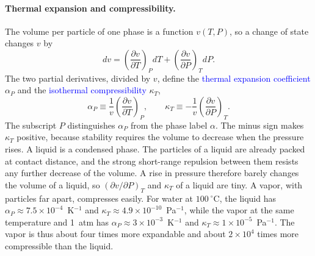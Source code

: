 \paragraph{Thermal expansion and compressibility.}
The volume per particle of one phase is a function $v(T,P)$, so a change of
state changes $v$ by
\begin{equation}
    dv=\left(\frac{\partial v}{\partial T}\right)_{\!P}dT
      +\left(\frac{\partial v}{\partial P}\right)_{\!T}dP.
\end{equation}
The two partial derivatives, divided by $v$, define the
\textcolor{blue}{thermal expansion coefficient} $\alpha_P$ and the
\textcolor{blue}{isothermal compressibility} $\kappa_T$,
\begin{equation}
    \boxed{\alpha_P\equiv\frac{1}{v}\left(\frac{\partial v}{\partial T}\right)_{\!P},
    \qquad
    \kappa_T\equiv-\frac{1}{v}\left(\frac{\partial v}{\partial P}\right)_{\!T}.}
\end{equation}
The subscript $P$ distinguishes $\alpha_P$ from the phase label $\alpha$.
The minus sign makes $\kappa_T$ positive, because stability requires the
volume to decrease when the pressure rises. A liquid is a condensed phase.
The particles of a liquid are already packed at contact distance, and the
strong short-range repulsion between them resists any further decrease of
the volume. A rise in pressure therefore barely changes the volume of a
liquid, so $(\partial v/\partial P)_T$ and $\kappa_T$ of a liquid are tiny.
A vapor, with particles far apart, compresses easily. For water at $100~^\circ$C, the liquid has
$\alpha_P\approx7.5\times10^{-4}$~K$^{-1}$ and
$\kappa_T\approx4.9\times10^{-10}$~Pa$^{-1}$, while the vapor at the same
temperature and 1~atm has $\alpha_P\approx3\times10^{-3}$~K$^{-1}$ and
$\kappa_T\approx1\times10^{-5}$~Pa$^{-1}$. The vapor is thus about four
times more expandable and about $2\times10^{4}$ times more compressible than
the liquid.


